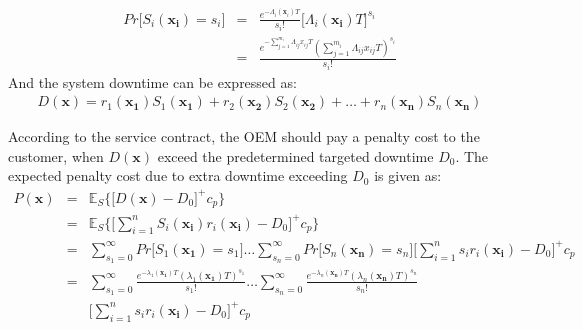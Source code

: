 \documentclass[preprint,12pt]{elsarticle}
\begin{document}
\begin {eqnarray}
Pr\bigg[S_{i}(\boldsymbol{x_i})=s_{i}\bigg]&=&\frac{e^{-\Lambda_{i}(\boldsymbol x_{i})T}}{s_{i}!}{\bigg[\Lambda_{i}(\boldsymbol{x_{i}})T\bigg]}^{s_{i}} \nonumber\\
&=& \frac{e^{-\sum_{j=1}^{m_{i}}{\Lambda_{ij}x_{ij}T}}(\sum_{j=1}^{m_{i}}{\Lambda_{ij}x_{ij}T})^{s_{i}}}{s_{i}!}
\end {eqnarray}
And the system downtime can be expressed as:
\begin{eqnarray}
D(\boldsymbol{x})= r_{1}(\boldsymbol{x_{1}})S_{1}(\boldsymbol{x_{1}})+r_{2}(\boldsymbol{x_{2}})S_{2}(\boldsymbol{x_{2}})+\ldots+r_{n}(\boldsymbol{x_{n}})S_{n}(\boldsymbol{x_{n}})
\label{D}
\end{eqnarray}

According to the service contract, the OEM should pay a penalty cost to the customer, when $D(\boldsymbol{x})$ exceed the predetermined targeted downtime $D_{0}$. The expected penalty cost due to extra downtime exceeding $D_{0}$ is given as:
\begin{eqnarray}
P(\boldsymbol{x})& = & \mathbb{E}_{S}\bigg\{\bigg[D(\boldsymbol{x})-D_{0}\bigg]^{+} c_{p} \bigg\} \nonumber\\
&=& \mathbb{E}_{S}\bigg\{\bigg[\sum_{i=1}^{n}{S_{i}(\boldsymbol{x_{i}})r_{i}(\boldsymbol{x_i})}-D_{0}\bigg]^{+} c_{p} \bigg\} \nonumber\\
&=&\sum_{s_{1}=0}^{\infty}{Pr\bigg[S_{1}(\boldsymbol{x_{1}})=s_{1}\bigg]}\dots\sum_{s_{n}=0}^{\infty}{Pr\bigg[S_{n}(\boldsymbol{x_{n}})=s_{n}\bigg]} \bigg[\sum_{i=1}^{n}{s_{i}r_{i}(\boldsymbol{x_{i}})}-D_{0}\bigg]^{+}c_{p} \nonumber\\
&=& \sum_{s_{1}=0}^{\infty}{\frac{e^{-\lambda_{1}(\boldsymbol{x_{1}})T}(\lambda_{1}(\boldsymbol{x_{1}})T)^{s_{1}}}{s_{1}!}}\dots\sum_{s_{n}=0}^{\infty}{\frac{e^{-\lambda_{n}(\boldsymbol{x_{n}})T}(\lambda_{n}(\boldsymbol{x_{n}})T)^{s_{n}}}{s_{n}!}} \nonumber\\
 &&\bigg[\sum_{i=1}^{n}{s_{i}r_{i}(\boldsymbol{x_{i}})}-D_{0}\bigg]^{+}c_{p}
\end{eqnarray}
\end{document}
